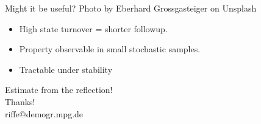\documentclass[20pt,usenames,dvipsnames]{beamer}
\begin{document}
\begin{frame}[plain]
\Large
\centering
Might it be useful?
\tiny
\flushright
\vspace{16cm}
   Photo by Eberhard Grossgasteiger on Unsplash
\end{frame}

  
  \begin{frame}[plain]
\Large
\begin{center}
\pause
\begin{itemize}[<+->]
  \item High state turnover = shorter followup.
  \item Property observable in small stochastic samples. 
  \item Tractable under stability
\end{itemize}
\end{center}
\end{frame}
  
\begin{frame}
\vspace{9cm}
\Large
\begin{center}
Estimate from the reflection!\\ Thanks! \\
riffe@demogr.mpg.de
\end{center}
\end{frame}


\end{document}
